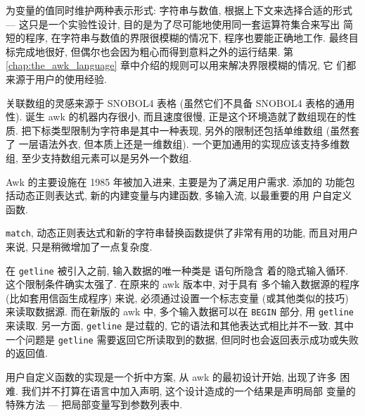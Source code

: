 为变量的值同时维护两种表示形式: 字符串与数值, 根据上下文来选择合适的形式
--- 这只是一个实验性设计, 目的是为了尽可能地使用同一套运算符集合来写出
简短的程序, 在字符串与数值的界限很模糊的情况下, 程序也要能正确地工作.
最终目标完成地很好, 但偶尔也会因为粗心而得到意料之外的运行结果. 第 
\ref{chap:the_awk_language} 章中介绍的规则可以用来解决界限模糊的情况, 它
们都来源于用户的使用经验.

关联数组的灵感来源于 SNOBOL4 表格 (虽然它们不具备 SNOBOL4 表格的通用性).
诞生 awk 的机器内存很小, 而且速度很慢, 正是这个环境造就了数组现在的性质.
把下标类型限制为字符串是其中一种表现, 另外的限制还包括单维数组 (虽然套了
一层语法外衣, 但本质上还是一维数组). 一个更加通用的实现应该支持多维数组,
至少支持数组元素可以是另外一个数组.

Awk 的主要设施在 1985 年被加入进来, 主要是为了满足用户需求. 添加的
功能包括动态正则表达式, 新的内建变量与内建函数, 多输入流, 以最重要的用
户自定义函数.

\texttt{match}, 动态正则表达式和新的字符串替换函数提供了非常有用的功能,
而且对用户来说, 只是稍微增加了一点复杂度.

在 \texttt{getline} 被引入之前, 输入数据的唯一种类是 \patact 语句所隐含
着的隐式输入循环. 这个限制条件确实太强了. 在原来的 awk 版本中, 对于具有
多个输入数据源的程序 (比如套用信函生成程序) 来说, 必须通过设置一个标志变量
(或其他类似的技巧) 来读取数据源. 而在新版的 awk 中, 多个输入数据可以在
\texttt{BEGIN} 部分, 用 \texttt{getline} 来读取. 另一方面, \texttt{getline}
是过载的, 它的语法和其他表达式相比并不一致. 其中一个问题是 \texttt{getline}
需要返回它所读取到的数据, 但同时也会返回表示成功或失败的返回值.

用户自定义函数的实现是一个折中方案, 从 awk 的最初设计开始, 出现了许多
困难. 我们并不打算在语言中加入声明, 这个设计造成的一个结果是声明局部
变量的特殊方法 --- 把局部变量写到参数列表中.
